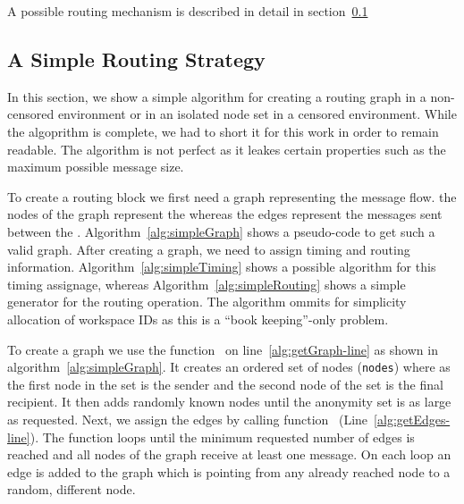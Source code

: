 A possible routing mechanism is described in detail in section~\ref{sec:simpleRoutingStrategy}

\subsection{A Simple Routing Strategy}\label{sec:simpleRoutingStrategy}
In this section, we show a simple algorithm for creating a routing graph in a non-censored environment or in an isolated node set in a censored environment. While the algoprithm is complete, we had to short it for this work in order to remain readable. The algorithm is not perfect as it leakes certain properties such as the maximum possible message size.

To create a routing block we first need a graph representing the message flow. the nodes of the graph represent the \VortexNodes whereas the edges represent the messages sent between the \VortexNodes. Algorithm~\ref{alg:simpleGraph} shows a pseudo-code to get such a valid graph. After creating a graph, we need to assign timing and routing information. Algorithm~\ref{alg:simpleTiming} shows a possible algorithm for this timing assignage, whereas Algorithm~\ref{alg:simpleRouting} shows a simple generator for the routing operation. The algorithm ommits for simplicity allocation of workspace IDs as this is a ``book keeping''-only problem.

To create a graph we use the function~ on line~\ref{alg:getGraph-line} as shown in algorithm~\ref{alg:simpleGraph}. It creates an ordered set of nodes (\texttt{nodes}) where as the first node in the set is the sender and the second node of the set is the final recipient. It then adds randomly known nodes until the anonymity set is as large as requested. Next, we assign the edges by calling function~ (Line~\ref{alg:getEdges-line}). The function loops until the minimum requested number of edges is reached and all nodes of the graph receive at least one message. On each loop an edge is added to the graph which is pointing from any already reached node to a random, different node.

